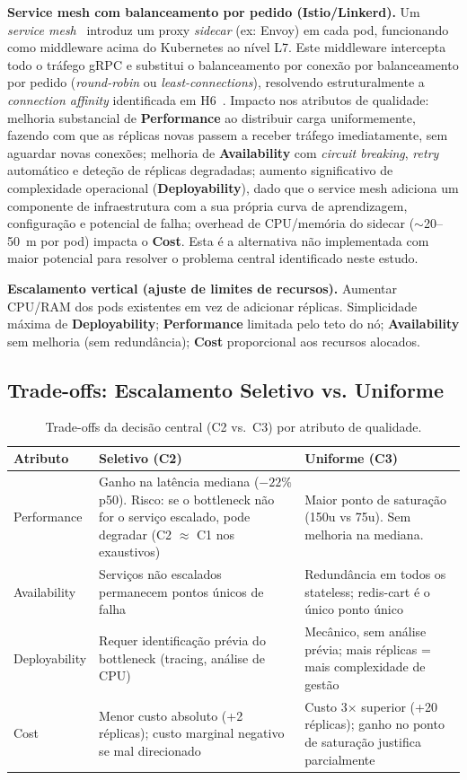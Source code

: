\documentclass[manuscript,screen,review]{acmart}
\begin{document}
\textbf{Service mesh com balanceamento por pedido (Istio/Linkerd).} Um \textit{service mesh}~\cite{servicemesh} introduz um proxy \textit{sidecar} (ex: Envoy) em cada pod, funcionando como middleware acima do Kubernetes ao nível L7. Este middleware intercepta todo o tráfego gRPC e substitui o balanceamento por conexão por balanceamento por pedido (\textit{round-robin} ou \textit{least-connections}), resolvendo estruturalmente a \textit{connection affinity} identificada em H6~\cite{k8sgrpc}. Impacto nos atributos de qualidade: melhoria substancial de \textbf{Performance} ao distribuir carga uniformemente, fazendo com que as réplicas novas passem a receber tráfego imediatamente, sem aguardar novas conexões; melhoria de \textbf{Availability} com \textit{circuit breaking}, \textit{retry} automático e deteção de réplicas degradadas; aumento significativo de complexidade operacional (\textbf{Deployability}), dado que o service mesh adiciona um componente de infraestrutura com a sua própria curva de aprendizagem, configuração e potencial de falha; overhead de CPU/memória do sidecar ($\sim$20--50~m por pod) impacta o \textbf{Cost}. Esta é a alternativa não implementada com maior potencial para resolver o problema central identificado neste estudo.

\textbf{Escalamento vertical (ajuste de limites de recursos).} Aumentar CPU/RAM dos pods existentes em vez de adicionar réplicas. Simplicidade máxima de \textbf{Deployability}; \textbf{Performance} limitada pelo teto do nó; \textbf{Availability} sem melhoria (sem redundância); \textbf{Cost} proporcional aos recursos alocados.

\subsection{Trade-offs: Escalamento Seletivo vs. Uniforme}

\begin{table}[t]
\caption{Trade-offs da decisão central (C2 vs.\ C3) por atributo de qualidade.}
\label{tab:tradeoffs}
\begin{tabular}{p{1.8cm}p{2.8cm}p{2.8cm}}
\toprule
\textbf{Atributo} & \textbf{Seletivo (C2)} & \textbf{Uniforme (C3)} \\
\midrule
Performance & Ganho na latência mediana ($-22\%$ p50). Risco: se o bottleneck não for o serviço escalado, pode degradar (C2 $\approx$ C1 nos exaustivos) & Maior ponto de saturação (150u vs 75u). Sem melhoria na mediana. \\
\addlinespace
Availability & Serviços não escalados permanecem pontos únicos de falha & Redundância em todos os stateless; redis-cart é o único ponto único \\
\addlinespace
Deployability & Requer identificação prévia do bottleneck (tracing, análise de CPU) & Mecânico, sem análise prévia; mais réplicas = mais complexidade de gestão \\
\addlinespace
Cost & Menor custo absoluto (+2 réplicas); custo marginal negativo se mal direcionado & Custo 3× superior (+20 réplicas); ganho no ponto de saturação justifica parcialmente \\
\bottomrule
\end{tabular}
\end{table}
\end{document}
